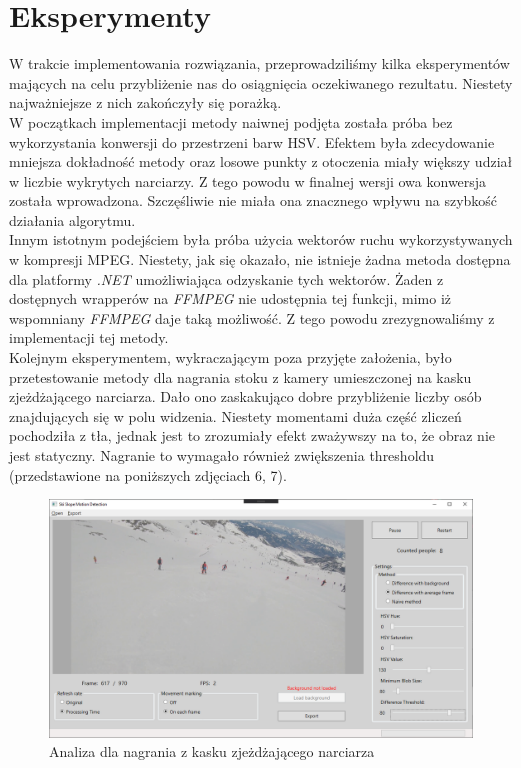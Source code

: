 \documentclass[a4paper]{article}
\begin{document}
\section{Eksperymenty}
W trakcie implementowania rozwiązania, przeprowadziliśmy kilka eksperymentów mających na celu przybliżenie nas do osiągnięcia oczekiwanego rezultatu. Niestety najważniejsze z nich zakończyły się porażką.\\
W początkach implementacji metody naiwnej podjęta została próba bez wykorzystania konwersji do przestrzeni barw HSV.  Efektem była zdecydowanie mniejsza dokładność metody oraz losowe punkty z otoczenia miały większy udział w liczbie wykrytych narciarzy. Z tego powodu w finalnej wersji owa konwersja została wprowadzona. Szczęśliwie nie miała ona znacznego wpływu na szybkość działania algorytmu.\\
Innym istotnym podejściem była próba użycia wektorów ruchu wykorzystywanych w kompresji MPEG. Niestety, jak się okazało, nie istnieje żadna metoda dostępna dla platformy \textit{.NET} umożliwiająca odzyskanie tych wektorów. Żaden z dostępnych wrapperów na \textit{FFMPEG} nie udostępnia tej funkcji, mimo iż wspomniany \textit{FFMPEG} daje taką możliwość. Z tego powodu zrezygnowaliśmy z implementacji tej metody. \\
Kolejnym eksperymentem, wykraczającym poza przyjęte założenia, było przetestowanie metody dla nagrania stoku z kamery umieszczonej na kasku zjeżdżającego narciarza. Dało ono zaskakująco dobre przybliżenie liczby osób znajdujących się w polu widzenia. Niestety momentami duża część zliczeń pochodziła z tła, jednak jest to zrozumiały efekt zważywszy na to, że obraz nie jest statyczny. Nagranie to wymagało również zwiększenia thresholdu (przedstawione na poniższych zdjęciach 6, 7).
\begin{figure}[H]
  \includegraphics[width=\linewidth]{resources/img6.png}
  \caption{Analiza dla nagrania z kasku zjeżdżającego narciarza}
\end{figure}
\end{document}
